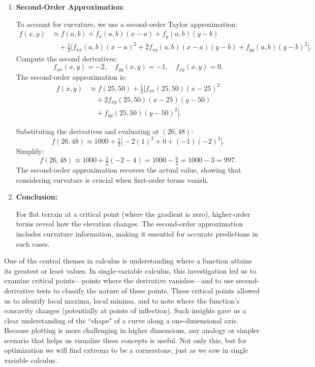\begin{example}
\begin{solution}
\begin{enumerate}
    \item \textbf{Second-Order Approximation:}  
    
    To account for curvature, we use a second-order Taylor approximation:
\[
\begin{split}
f(x,y) &\approx f(a,b) + f_x(a,b)(x-a) + f_y(a,b)(y-b) \\
&\quad + \tfrac{1}{2}\bigl[f_{xx}(a,b)(x-a)^2 + 2f_{xy}(a,b)(x-a)(y-b) + f_{yy}(a,b)(y-b)^2\bigr].
\end{split}
\]
Compute the second derivatives:
    \[
    f_{xx}(x,y) = -2, \quad f_{yy}(x,y) = -1, \quad f_{xy}(x,y) = 0.
    \]
    The second-order approximation is:
\[
\begin{split}
f(x,y) &\approx f(25,50) + \tfrac{1}{2}\bigl[f_{xx}(25,50)(x-25)^2 \\
&\quad + 2f_{xy}(25,50)(x-25)(y-50) \\
&\quad + f_{yy}(25,50)(y-50)^2\bigr].
\end{split}
\]

    Substituting the derivatives and evaluating at \((26,48)\):
    \[
    f(26,48) \approx 1000 + \tfrac{1}{2}\bigl[-2(1)^2 + 0 + (-1)(-2)^2\bigr].
    \]
    Simplify:
    \[
    f(26,48) \approx 1000 + \tfrac{1}{2}(-2 - 4) = 1000 - \tfrac{6}{2} = 1000 - 3 = 997.
    \]
    The second-order approximation recovers the actual value, showing that considering curvature is crucial when first-order terms vanish.
    
    \item \textbf{Conclusion:}
    
    For flat terrain at a critical point (where the gradient is zero), higher-order terms reveal how the elevation changes. The second-order approximation includes curvature information, making it essential for accurate predictions in such cases.
\end{enumerate}
\end{solution}
\end{example}
\exampleline




\newpage


\noindent One of the central themes in calculus is understanding where a function attains its greatest or least values. In single-variable calculus, this investigation led us to examine critical points—points where the derivative vanishes—and to use second-derivative tests to classify the nature of these points. These critical points allowed us to identify local maxima, local minima, and to note where the function’s concavity changes (potentially at points of inflection). Such insights gave us a clear understanding of the ``shape" of a curve along a one-dimensional axis. Because plotting is more challenging in higher dimensions, any analogy or simpler scenario that helps us visualize these concepts is useful. Not only this, but for optimization we will find extrema to be a cornerstone, just as we saw in single variable calculus. \\


